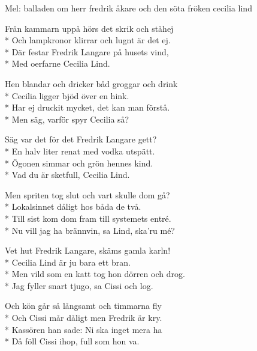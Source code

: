 \begin{SongText}
    \begin{SongInfo}
        Mel: balladen om herr fredrik åkare och den söta fröken cecilia lind
    \end{SongInfo}
    \begin{SongVerse}
        Från kammarn uppå hörs det skrik och ståhej\\*%
        Och lampkronor klirrar och lugnt är det ej.\\*%
        Där festar Fredrik Langare på husets vind,\\*%
        Med oerfarne Cecilia Lind.
    \end{SongVerse}
    \begin{SongVerse}
        Hen blandar och dricker båd groggar och drink\\*%
        Cecilia ligger bjöd över en hink.\\*%
        Har ej druckit mycket, det kan man förstå.\\*%
        Men säg, varför spyr Cecilia så?
    \end{SongVerse}
    \begin{SongVerse}
        Säg var det för det Fredrik Langare gett?\\*%
        En halv liter renat med vodka utspätt.\\*%
        Ögonen simmar och grön hennes kind.\\*%
        Vad du är sketfull, Cecilia Lind.
    \end{SongVerse}
    \begin{SongVerse}
        Men spriten tog slut och vart skulle dom gå?\\*%
        Lokalsinnet dåligt hos båda de två.\\*%
        Till sist kom dom fram till systemets entré.\\*%
        Nu vill jag ha brännvin, sa Lind, ska’ru mé?
    \end{SongVerse}
    \begin{SongVerse}
        Vet hut Fredrik Langare, skäms gamla karln!\\*%
        Cecilia Lind är ju bara ett bran.\\*%
        Men vild som en katt tog hon dörren och drog.\\*%
        Jag fyller snart tjugo, sa Cissi och log.
    \end{SongVerse}
    \begin{SongVerse}
        Och kön går så långsamt och timmarna fly\\*%
        Och Cissi mår dåligt men Fredrik är kry.\\*%
        Kassören han sade: Ni ska inget mera ha\\*%
        Då föll Cissi ihop, full som hon va.
    \end{SongVerse}
\end{SongText}
